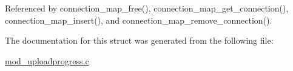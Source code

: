 Referenced by connection\-\_\-map\-\_\-free(), connection\-\_\-map\-\_\-get\-\_\-connection(), connection\-\_\-map\-\_\-insert(), and connection\-\_\-map\-\_\-remove\-\_\-connection().



The documentation for this struct was generated from the following file\-:\begin{DoxyCompactItemize}
\item 
\hyperlink{mod__uploadprogress_8c}{mod\-\_\-uploadprogress.\-c}\end{DoxyCompactItemize}
